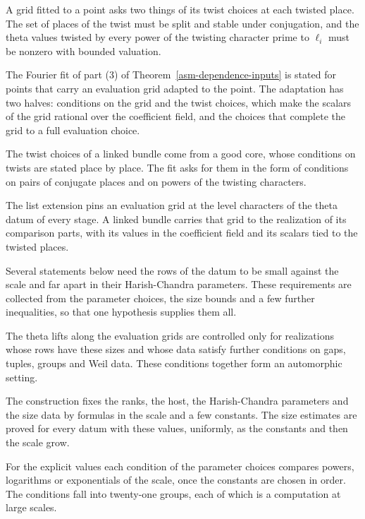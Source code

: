 A grid fitted to a point asks two things of its twist choices at each twisted
place. The set of places of the twist must be split and stable under
conjugation, and the theta values twisted by every power of the twisting
character prime to $\ell_i$ must be nonzero with bounded valuation.

The Fourier fit of part (3) of Theorem~\ref{asm-dependence-inputs} is stated for
points that carry an evaluation grid adapted to the point. The adaptation has
two halves: conditions on the grid and the twist choices, which make the
scalars of the grid rational over the coefficient field, and the choices that
complete the grid to a full evaluation choice.

The twist choices of a linked bundle come from a good core, whose conditions on
twists are stated place by place. The fit asks for them in the form of
conditions on pairs of conjugate places and on powers of the twisting
characters.

The list extension pins an evaluation grid at the level characters of the theta
datum of every stage. A linked bundle carries that grid to the realization of
its comparison parts, with its values in the coefficient field and its scalars
tied to the twisted places.

Several statements below need the rows of the datum to be small against the
scale and far apart in their Harish-Chandra parameters. These requirements are
collected from the parameter choices, the size bounds and a few further
inequalities, so that one hypothesis supplies them all.

The theta lifts along the evaluation grids are controlled only for
realizations whose rows have these sizes and whose data satisfy further
conditions on gaps, tuples, groups and Weil data. These conditions together
form an automorphic setting.

The construction fixes the ranks, the host, the Harish-Chandra parameters and the size data by
formulas in the scale and a few constants. The size estimates are proved for every datum with
these values, uniformly, as the constants and then the scale grow.

For the explicit values each condition of the parameter choices compares powers, logarithms or
exponentials of the scale, once the constants are chosen in order. The conditions fall into
twenty-one groups, each of which is a computation at large scales.

